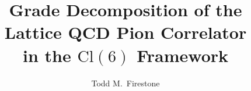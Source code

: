 \documentclass[12pt]{article}
\theoremstyle{definition}
\theoremstyle{remark}
\newcommand{\cl}{\mathrm{Cl}}           %
\begin{document}
	
	\title{%
		\textbf{Grade Decomposition of the Lattice QCD Pion Correlator}\\[4pt]
		\textbf{in the \texorpdfstring{$\cl(6)$}{Cl(6)} Framework}%
	}
	
	\author{Todd M.\ Firestone}
	
	\date{%
		\small\textit{ }%
	}
	
	\maketitle
	\thispagestyle{fancy}
	
\end{document}
